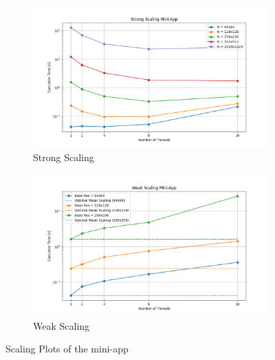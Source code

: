 \begin{figure}[H]
    \centering
    \begin{subfigure}[b]{0.8\textwidth}
        \centering
	\includegraphics[width=\textwidth]{../media/strong_scaling.png}
	\caption{Strong Scaling}
	\label{fig:strong}
    \end{subfigure}
    \hfill 
    \begin{subfigure}[b]{0.8\textwidth}
        \centering
\includegraphics[width=\textwidth]{../media/weak_scaling.png}
	\caption{Weak Scaling}
	\label{fig:weak}

    \end{subfigure}
    \caption{Scaling Plots of the mini-app}
    \label{fig:scaling}
\end{figure}

